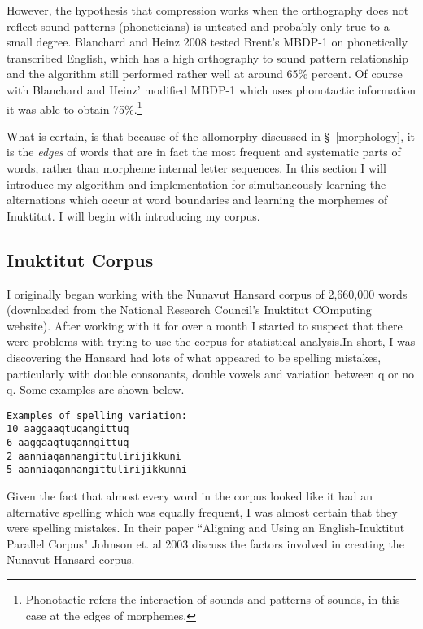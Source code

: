 \documentclass[runningheads,a4paper]{llncs}
\begin{document}
However, the hypothesis that compression works when the orthography does not reflect sound patterns (phoneticians) is untested and probably only true to a small degree. Blanchard and Heinz 2008 tested Brent's MBDP-1 on phonetically transcribed English, which has a high orthography to sound pattern relationship and the algorithm still performed rather well at around 65\% percent. Of course with Blanchard and Heinz' modified MBDP-1 which uses phonotactic information it was able to obtain 75\%.\footnote{Phonotactic refers the interaction of sounds and patterns of sounds, in this case at the edges of morphemes.}

What is certain, is that because of the allomorphy discussed in \S~\ref{morphology}, it is the \textit{edges} of words that are in fact the most frequent and systematic parts of words, rather than morpheme internal letter sequences. In this section I will introduce my algorithm and implementation for simultaneously learning the alternations which occur at word boundaries and learning the morphemes of Inuktitut. I will begin with introducing my corpus. 


\subsection{Inuktitut Corpus}

I originally began working with the Nunavut Hansard corpus of 2,660,000 words (downloaded from the National Research Council's Inuktitut COmputing website). After working with it for over a month I started to suspect that there were problems with trying to use the corpus for statistical analysis.In short, I was discovering the Hansard had lots of what appeared to be spelling mistakes, particularly with double consonants, double vowels and variation between q or no q. Some examples are shown below.

\begin{verbatim}
Examples of spelling variation:
10 aaggaaqtuqangittuq
6 aaggaaqtuqanngittuq
2 aanniaqannangittulirijikkuni
5 aanniaqannangittulirijikkunni
\end{verbatim}

Given the fact that almost every word in the corpus looked like it had an alternative spelling which was equally frequent, I was almost certain that they were spelling mistakes. In their paper ``Aligning and Using an English-Inuktitut Parallel Corpus" Johnson et. al 2003 discuss the factors involved in creating the Nunavut Hansard corpus. 
\end{document}

